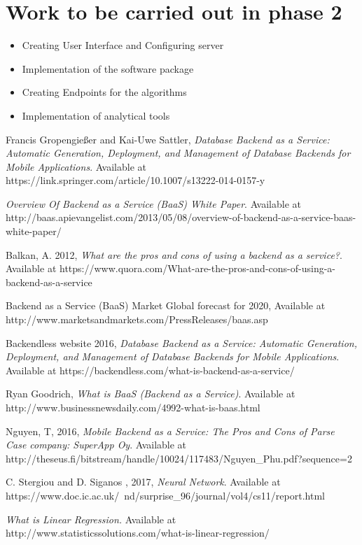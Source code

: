 \documentclass[a4paper,12pt]{report}
\begin{document}
    \section{Work to be carried out in phase 2}
    \begin{itemize}
      \item  Creating User Interface and Configuring server
      \item  Implementation of the software package
      \item  Creating Endpoints for the algorithms
      \item  Implementation of analytical tools 
    \end{itemize}    
    
    \renewcommand{\bibname}{References}
    \begin{thebibliography}{9}
    Francis Gropengießer and Kai-Uwe Sattler,
    \emph{Database Backend as a Service: Automatic Generation, Deployment, and Management of Database Backends for Mobile Applications}.
    Available at https://link.springer.com/article/10.1007/s13222-014-0157-y
    
    \emph{Overview Of Backend as a Service (BaaS) White Paper}.
    Available at http://baas.apievangelist.com/2013/05/08/overview-of-backend-as-a-service-baas-white-paper/
    
    
    Balkan, A. 2012,
    \emph{What are the pros and cons of using a backend as a service?}.
    Available at https://www.quora.com/What-are-the-pros-and-cons-of-using-a-backend-as-a-service
    
    Backend as a Service (BaaS) Market Global forecast for 2020,
    Available at http://www.marketsandmarkets.com/PressReleases/baas.asp		
    
    Backendless website 2016,
    \emph{Database Backend as a Service: Automatic Generation, Deployment, and Management of Database Backends for Mobile Applications}.
    Available at https://backendless.com/what-is-backend-as-a-service/
    
    
    Ryan Goodrich,
    \emph{What is BaaS (Backend as a Service)}.
    Available at http://www.businessnewsdaily.com/4992-what-is-baas.html	
    
    Nguyen, T, 2016,
    \emph{Mobile Backend as a Service: The Pros and Cons of Parse
    	Case company: SuperApp Oy}.
    Available at http://theseus.fi/bitstream/handle/10024/117483/Nguyen{\_}Phu.pdf?sequence=2
    
    C. Stergiou and D. Siganos , 2017,
    \emph{Neural Network}.
    Available at 
    https://www.doc.ic.ac.uk/~nd/surprise{\_}96/journal/vol4/cs11/report.html    
    
    \emph{What is Linear Regression.}
    Available at http://www.statisticssolutions.com/what-is-linear-regression/
    
		
		\end{thebibliography}	
    
\end{document}
